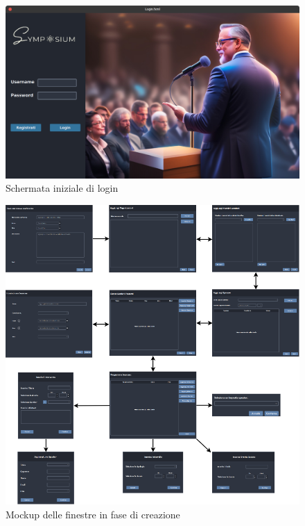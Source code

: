 \begin{figure}[h!]
	\centering
	\includegraphics[scale=0.2]{Immagini/Login.png}
	\caption{Schermata iniziale di login}\label{login}
\end{figure}
\begin{figure}[h!]
	\centering
	\includegraphics[scale=0.57]{Immagini/Mockup/Create/Flow_Create.png}
	\caption{Mockup delle finestre in fase di creazione}\label{create}
\end{figure}

